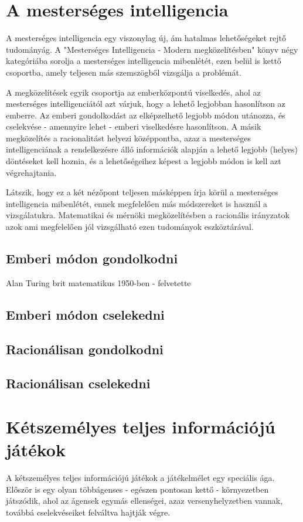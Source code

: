 \label{Chap:tema}

\section {A mesterséges intelligencia}
A mesterséges intelligencia egy viszonylag új, ám hatalmas lehetőségeket rejtő tudományág. A "Mesterséges Intelligencia - Modern megközelítésben" könyv négy kategóriába sorolja a mesterséges intelligencia mibenlétét, ezen belül is kettő csoportba, amely teljesen más szemszögből vizsgálja a problémát.\ujsor

A megközelítések egyik csoportja az emberközpontú viselkedés, ahol az mesterséges intelligenciától azt várjuk, hogy a lehető legjobban hasonlítson az emberre. Az emberi gondolkodást az elképzelhető legjobb módon utánozza, és cselekvése - amennyire lehet - emberi viselkedésre hasonlítson. A másik megközelítés a racionalitást helyezi középpontba, azaz a mesterséges intelligenciának a rendelkezésre álló információk alapján a lehető legjobb (helyes) döntéseket kell hoznia, és a lehetőségeihez képest a legjobb módon is kell azt végrehajtania. \ujsor

Látszik, hogy ez a két nézőpont teljesen másképpen írja körül a mesterséges intelligencia mibenlétét, ennek megfelelően más módszereket is használ a vizsgálatukra. Matematikai és mérnöki megközelítésben a racionális irányzatok azok ami megfelelően jól vizsgálható ezen tudományok eszköztárával.\ujsor

\subsection{Emberi módon gondolkodni}
Alan Turing brit matematikus 1950-ben - felvetette
\subsection{Emberi módon cselekedni}
\subsection{Racionálisan gondolkodni}
\subsection{Racionálisan cselekedni}

\section{Kétszemélyes teljes információjú játékok}
A kétszemélyes teljes információjú játékok a játékelmélet egy speciális ága. Először is egy olyan többágenses - egészen pontosan kettő - környezetben játszódik, ahol az ágensek egymás ellenségei, azaz versenyhelyzetben vannak, továbbá cselekvéseiket felváltva hajtják végre.\ujsor

